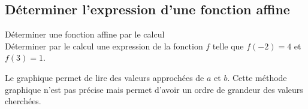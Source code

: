 \vspace{0.3cm}
\subsection{Déterminer l'expression d'une fonction affine}

\begin{Méthodes}Déterminer une fonction affine par le calcul \\
Déterminer par le calcul une expression de la fonction $f$ telle que $f (-2) = 4$ et $f (3) = 1$.
\vspace{0.1cm}

\ligne

\ligne

\ligne

\ligne

\ligne

\ligne

\ligne

\ligne

\ligne

\ligne

\ligne

\begin{Remarque}
Le graphique permet de lire des valeurs approchées de $a$ et $b$.
Cette méthode graphique n'est pas précise mais permet d'avoir un ordre de grandeur des valeurs cherchées.
\end{Remarque}
\end{Méthodes}

\bigskip

\newpage

